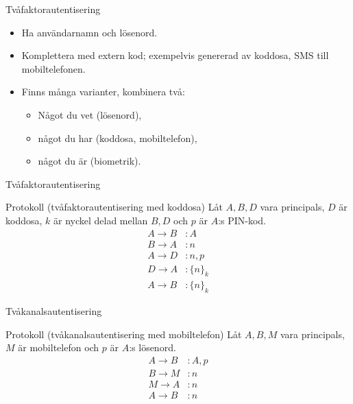 \documentclass{beamer}
\theoremstyle{definition}
\theoremstyle{remark}
\newcommand{\encrypt}[2]{\{#1\}_{#2}}
\begin{document}
\begin{frame}{Tvåfaktorautentisering}
  \begin{itemize}
    \item Ha användarnamn och lösenord.
    \item Komplettera med extern kod; exempelvis genererad av koddosa, SMS till 
      mobiltelefonen.
    \item Finns många varianter, kombinera två:
      \begin{itemize}
        \item Något du vet (lösenord),
        \item något du har (koddosa, mobiltelefon),
        \item något du är (biometrik).
      \end{itemize}
  \end{itemize}
\end{frame}

\begin{frame}{Tvåfaktorautentisering}
  \begin{block}{Protokoll (tvåfaktorautentisering med koddosa)}
    Låt \(A, B, D\) vara principals, \(D\) är koddosa, \(k\) är nyckel delad 
    mellan \(B, D\) och \(p\) är \(A\):s PIN-kod.
    \begin{align*}
      A\to B &\colon A \\
      B\to A &\colon n \\
      A\to D &\colon n, p \\
      D\to A &\colon \encrypt{n}{k} \\
      A\to B &\colon \encrypt{n}{k}
    \end{align*}
  \end{block}
\end{frame}

\begin{frame}{Tvåkanalsautentisering}
  \begin{block}{Protokoll (tvåkanalsautentisering med mobiltelefon)}
    Låt \(A, B, M\) vara principals, \(M\) är mobiltelefon och \(p\) är \(A\):s 
    lösenord.
    \begin{align*}
      A\to B &\colon A, p \\
      B\to M &\colon n \\
      M\to A &\colon n \\
      A\to B &\colon n
    \end{align*}
  \end{block}
\end{frame}
\end{document}
